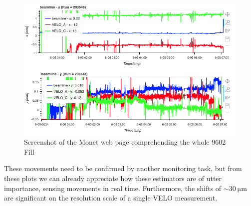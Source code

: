 \begin{figure}
    \centering
    \includegraphics[width=\textwidth]{figures/Fill9602.png}
    \caption{Screenshot of the Monet web page comprehending the whole 9602 Fill}
    \label{fig:fill9602}
\end{figure}

These movements need to be confirmed by another monitoring task, but from these plots we can already appreciate how these estimators are of utter importance, sensing movements in real time. Furthermore, the shifts of $\sim\SI{30}{\micro\meter}$ are significant on the resolution scale of a single VELO measurement. 